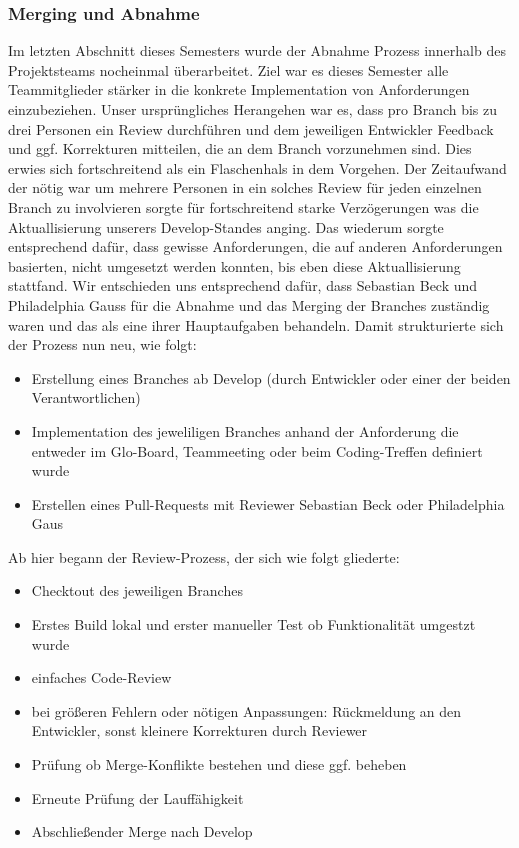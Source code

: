 \subsubsection{Merging und Abnahme}
Im letzten Abschnitt dieses Semesters wurde der Abnahme Prozess innerhalb des Projektsteams nocheinmal überarbeitet.
Ziel war es dieses Semester alle Teammitglieder stärker in die konkrete Implementation von Anforderungen einzubeziehen. Unser ursprüngliches Herangehen war es, dass pro Branch bis zu drei Personen ein Review durchführen und dem jeweiligen Entwickler Feedback und ggf. Korrekturen mitteilen, die an dem Branch vorzunehmen sind. Dies erwies sich fortschreitend als ein Flaschenhals in dem Vorgehen. Der Zeitaufwand der nötig war um mehrere Personen in ein solches Review für jeden einzelnen Branch zu involvieren sorgte für fortschreitend starke Verzögerungen was die Aktuallisierung unserers Develop-Standes anging. Das wiederum sorgte entsprechend dafür, dass gewisse Anforderungen, die auf anderen Anforderungen basierten, nicht umgesetzt werden konnten, bis eben diese Aktuallisierung stattfand. Wir entschieden uns entsprechend dafür, dass Sebastian Beck und Philadelphia Gauss für die Abnahme und das Merging der Branches zuständig waren und das als eine ihrer Hauptaufgaben behandeln. 
Damit strukturierte sich der Prozess nun neu, wie folgt:
\begin{itemize}
\item Erstellung eines Branches ab Develop (durch Entwickler oder einer der beiden Verantwortlichen)
\item Implementation des jeweliligen Branches anhand der Anforderung die entweder im Glo-Board, Teammeeting oder beim Coding-Treffen definiert wurde
\item Erstellen eines Pull-Requests mit Reviewer Sebastian Beck oder Philadelphia Gaus 
\end{itemize}
Ab hier begann der Review-Prozess, der sich wie folgt gliederte:
\begin{itemize}
\item Checktout des jeweiligen Branches
\item Erstes Build lokal und erster manueller Test ob Funktionalität umgestzt wurde
\item einfaches Code-Review
\item bei größeren Fehlern oder nötigen Anpassungen: Rückmeldung an den Entwickler, sonst kleinere Korrekturen durch Reviewer
\item Prüfung ob Merge-Konflikte bestehen und diese ggf. beheben
\item Erneute Prüfung der Lauffähigkeit
\item Abschließender Merge nach Develop
\end{itemize}

